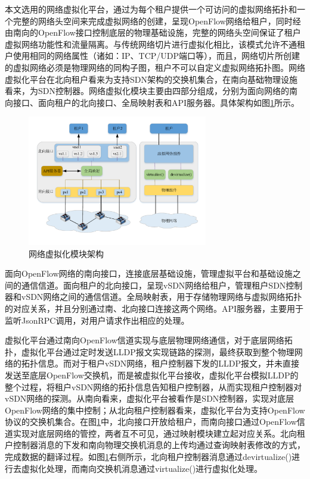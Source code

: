 本文选用的网络虚拟化平台，通过为每个租户提供一个可访问的虚拟网络拓扑和一个完整的网络头空间来完成虚拟网络的创建，呈现OpenFlow网络给租户，同时经由南向的OpenFlow接口控制底层的物理基础设施，完整的网络头空间保证了租户虚拟网络功能性和流量隔离\cite{Virtual-3}。与传统网络切片进行虚拟化相比，该模式允许不通租户使用相同的网络属性（诸如：IP、TCP/UDP端口等），而且，网络切片所创建的虚拟网络必须是物理网络的同构子图，租户不可以自定义虚拟网络拓扑图。网络虚拟化平台在北向租户看来为支持SDN架构的交换机集合，在南向基础物理设施看来，为SDN控制器。网络虚拟化模块主要由四部分组成，分别为面向网络的南向接口、面向租户的北向接口、全局映射表和API服务器\cite{OVX-1}。具体架构如图\ref{fig:virtual}所示。

\begin{figure}[!htb]
  \centering
  \includegraphics[width=0.7\textwidth]{logo/virtual-detail}
  \caption{网络虚拟化模块架构}
  \label{fig:virtual}
\end{figure}

面向OpenFlow网络的南向接口，连接底层基础设施，管理虚拟平台和基础设施之间的通信信道。面向租户的北向接口，呈现vSDN网络给租户，管理租户SDN控制器和vSDN网络之间的通信信道。全局映射表，用于存储物理网络与虚拟网络拓扑的对应关系，并且分别通过南、北向接口连接这两个网络。API服务器，主要用于监听JsonRPC调用，对用户请求作出相应的处理。

虚拟化平台通过南向OpenFlow信道实现与底层物理网络通信，对于底层网络拓扑，虚拟化平台通过定时发送LLDP报文实现链路的探测，最终获取到整个物理网络的拓扑信息。而对于租户vSDN网络，租户控制器下发的LLDP报文，并未直接发送至底层OpenFlow交换机，而是被虚拟化平台接收，虚拟化平台模拟LLDP的整个过程，将租户vSDN网络的拓扑信息告知租户控制器，从而实现租户控制器对vSDN网络的探测。从南向看来，虚拟化平台被看作是SDN控制器，实现对底层OpenFlow网络的集中控制；从北向租户控制器看来，虚拟化平台为支持OpenFlow协议的交换机集合。在图\ref{fig:virtual}中，北向接口开放给租户，而南向接口通过OpenFlow信道实现对底层网络的管控，两者互不可见，通过映射模块建立起对应关系。北向租户控制器消息的下发和南向物理交换机消息的上传均通过查询映射表修改的方式，完成数据的翻译过程。如图\ref{fig:virtual}右侧所示，北向租户控制器消息通过devirtualize()进行去虚拟化处理，而南向交换机消息通过virtualize()进行虚拟化处理。

